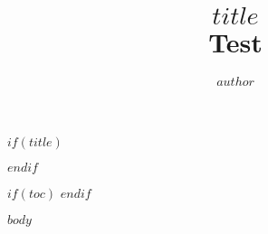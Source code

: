\documentclass{article}
\title{{\contrastfont\fontsize{24}{12}\upshape\bfseries $title$ \\
\normalfont Test}}
\author{$author$}
\begin{document}
$if(title)$
\begin{titlingpage}
\maketitle
\end{titlingpage}
$endif$

$if(toc)$
\tableofcontents
\newpage
$endif$

$body$
\end{document}
